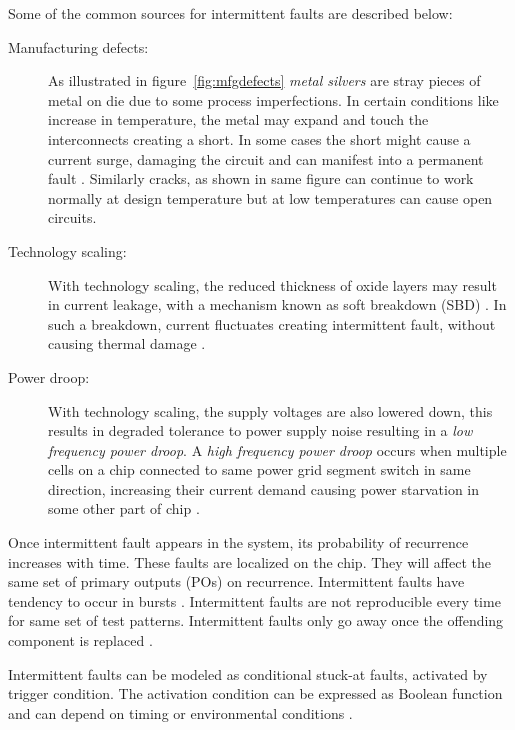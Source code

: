 Some of the common sources for intermittent faults are described below:
\begin{description}
\item[Manufacturing defects:] As illustrated in figure~\ref{fig:mfgdefects} \emph{metal silvers} are stray pieces of metal on die due to some process imperfections. In certain conditions like increase in temperature, the metal may expand and touch the interconnects creating a short. In some cases the short might cause a current surge, damaging the circuit and can manifest into a permanent fault \cite{Hawkins2003}. Similarly cracks, as shown in same figure can continue to work normally at design temperature but at low temperatures can cause open circuits.

\item[Technology scaling:] With technology scaling, the reduced thickness of oxide layers may result in current leakage, with a mechanism known as soft breakdown (SBD) \cite{Stathis2001}. In such a breakdown, current fluctuates creating intermittent fault, without causing thermal damage \cite{Stathis2001, Constantinescu2007a, Constantinescu2007}. 

\item[Power droop:] With technology scaling, the supply voltages are also lowered down, this results in degraded tolerance to power supply noise resulting in a \emph{low frequency power droop}\cite{Polian2007}. A \emph{high frequency power droop} occurs when multiple cells on a chip connected to same power grid segment switch in same direction, increasing their current demand causing power starvation in some other part of chip \cite{Polian2007}. 
\end{description}

Once intermittent fault appears in the system, its probability of recurrence increases with time\cite{Bondavalli2000}. These faults are localized on the chip. They will affect the same set of primary outputs (POs) on recurrence. Intermittent faults have tendency to occur in bursts \cite{Constantinescu2007, Constantinescu2003}. Intermittent faults are not reproducible every time for same set of test patterns. Intermittent faults only go away once the offending component is replaced \cite{Constantinescu2007}.

Intermittent faults can be modeled as conditional stuck-at faults, activated by trigger condition. The activation condition can be expressed as Boolean function and can depend on timing or environmental conditions \cite{Holst2009}.

